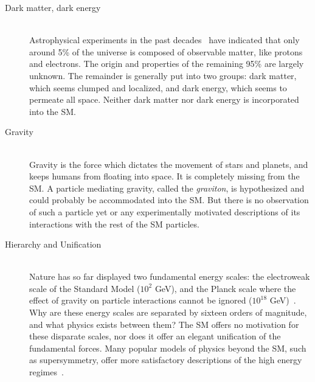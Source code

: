 \begin{description}

    \item[Dark matter, dark energy] \hfill \\
      Astrophysical experiments in the past decades~\cite{2006.darkmatter,2013.planck} have indicated that only around 5\% of the universe is composed of observable matter, like protons and electrons. The origin and properties of the remaining 95\% are largely unknown. The remainder is generally put into two groups: dark matter, which seems clumped and localized, and dark energy, which seems to permeate all space. Neither dark matter nor dark energy is incorporated into the SM.

    \item[Gravity] \hfill \\
      Gravity is the force which dictates the movement of stars and planets, and keeps humans from floating into space. It is completely missing from the SM. A particle mediating gravity, called the \textit{graviton}, is hypothesized and could probably be accommodated into the SM. But there is no observation of such a particle yet or any experimentally motivated descriptions of its interactions with the rest of the SM particles.

    \item[Hierarchy and Unification] \hfill \\
      Nature has so far displayed two fundamental energy scales: the electroweak scale of the Standard Model ($10^{2}$ GeV), and the Planck scale where the effect of gravity on particle interactions cannot be ignored ($10^{18}$ GeV)~\cite{1998.hierarchy}. Why are these energy scales are separated by sixteen orders of magnitude, and what physics exists between them? The SM offers no motivation for these disparate scales, nor does it offer an elegant unification of the fundamental forces. Many popular models of physics beyond the SM, such as supersymmetry, offer more satisfactory descriptions of the high energy regimes~\cite{1997.susyprimer}.

\end{description}

